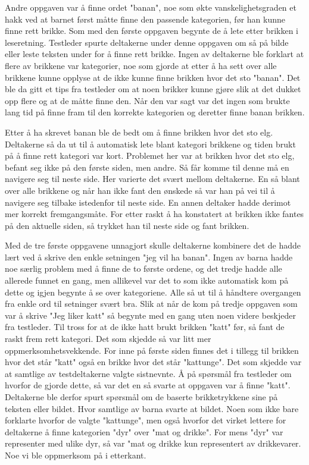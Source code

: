  
Andre oppgaven var å finne ordet "banan", noe som økte vanskelighetsgraden et hakk ved at barnet først måtte finne den passende kategorien, før han kunne finne rett brikke. Som med den første oppgaven begynte de å lete etter brikken i leseretning. Testleder spurte deltakerne under denne oppgaven om så på bilde eller leste teksten under for å finne rett brikke. Ingen av deltakerne ble forklart at flere av brikkene var kategorier, noe som gjorde at etter å ha sett over alle brikkene kunne opplyse at de ikke kunne finne brikken hvor det sto "banan". 
Det ble da gitt et tips fra testleder om at noen brikker kunne gjøre slik at det dukket opp flere og at de måtte finne den. Når den var sagt var det ingen som brukte lang tid på finne fram til den korrekte kategorien og deretter finne banan brikken.  
 
 
Etter å ha skrevet banan ble de bedt om å finne brikken hvor det sto elg. Deltakerne så da ut til å automatisk lete blant kategori brikkene og tiden brukt på å finne rett kategori var kort. Problemet her var at brikken hvor det sto elg, befant seg ikke på den første siden, men andre. Så får komme til denne må en navigere seg til neste side. Her varierte det svært mellom deltakerne. En så blant over alle brikkene og når han ikke fant den ønskede så var han på vei til å navigere seg tilbake istedenfor til neste side. En annen deltaker hadde derimot mer korrekt fremgangsmåte. For etter raskt å ha konstatert at brikken ikke fantes på den aktuelle siden, så trykket han til neste side og fant brikken.  
 
 
 
 
Med de tre første oppgavene unnagjort skulle deltakerne kombinere det de hadde lært ved å skrive den enkle setningen "jeg vil ha banan". Ingen av barna hadde noe særlig problem med å finne de to første ordene,  og det tredje hadde alle allerede funnet en gang, men allikevel var det to som ikke automatisk kom på dette og igjen begynte å se over kategoriene. Alle så ut til å håndtere overgangen fra enkle ord til setninger svært bra. Slik at når de kom på tredje oppgaven som var å skrive "Jeg liker katt" så begynte med en gang uten noen videre beskjeder fra testleder. Til tross for at de ikke hatt brukt brikken "katt" før, så fant de raskt frem rett kategori. Det som skjedde så var litt mer oppmerksomhetsvekkende. For inne på første siden finnes det i tillegg til brikken hvor det står "katt" også en brikke hvor det står "kattunge". Det som skjedde var at samtlige av testdeltakerne valgte sistnevnte. Å på spørsmål fra testleder om hvorfor de gjorde dette, så var det en så svarte at oppgaven var å finne "katt". Deltakerne ble derfor spurt spørsmål om de baserte brikketrykkene sine på teksten eller bildet. Hvor samtlige av barna svarte at bildet. Noen som ikke bare forklarte hvorfor de valgte "kattunge", men også hvorfor det virket lettere for deltakerne å finne kategorien "dyr" over "mat og drikke". For mens "dyr" var representer med ulike dyr, så var "mat og drikke kun representert av drikkevarer. Noe vi ble oppmerksom på i etterkant. 
 
